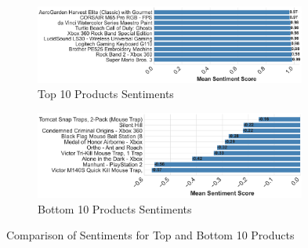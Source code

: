 \begin{figure}[h]
  \centering
  \begin{subfigure}{\textwidth}
    \centering
    \includegraphics[width=0.98\textwidth]{Figures/Top_10_Products_Sentiments.pdf} %
    \caption{Top 10 Products Sentiments}
    \label{fig:top 10 products sentiments}
  \end{subfigure}
  \hfill
  \begin{subfigure}{\textwidth}
    \centering
    \includegraphics[width=0.98\textwidth]{Figures/Bottom_10_Products_Sentiments.pdf} %
    \caption{Bottom 10 Products Sentiments}
    \label{fig:bottom 10 products sentiments}
  \end{subfigure}
  \caption{Comparison of Sentiments for Top and Bottom 10 Products}
  \label{fig:comparison_sentiments}
\end{figure}


